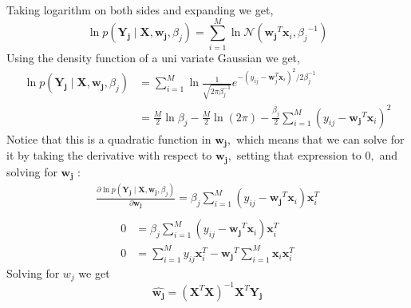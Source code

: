 \documentclass[english,a4paper,12pt]{article}
\begin{document}
\begin{enumerate}
\begin{itemize}
$$$$
Taking logarithm on both sides and expanding we get,
$$
\ln p(\mathbf{Y_j} \mid \mathbf{X}, \mathbf{w_j}, \beta_{j})=\sum_{i=1}^{M} \ln \mathcal{N}\left(\mathbf{w_j}^{T} \mathbf{x}_{i}, {\beta_j}^{-1}\right)
$$
Using the density function of a uni variate Gaussian we get,
$$
\begin{aligned}
\ln p(\mathbf{{Y}_{j}} \mid \mathbf{X}, \mathbf{{w}_{j}}, \beta_{j}) &=\sum_{i=1}^{M} \ln \frac{1}{\sqrt{2 \pi \beta_{j}^{-1}}} e^{-\left(y_{ij}-\mathbf{w}_{j}^{T} \mathbf{x}_{i}\right)^{2} / 2 \beta_{j}^{-1}} \\
&=\frac{M}{2} \ln \beta_{j}-\frac{M}{2} \ln(2 \pi)-\frac{\beta_{j}}{2} \sum_{i=1}^{M}\left(y_{ij}-\mathbf{w_j}^{T} \mathbf{x}_{i}\right)^{2}
\end{aligned}
$$
Notice that this is a quadratic function in $\mathbf{w_j},$ which means that we can solve for it by taking the derivative with respect to $\mathbf{w_j},$ setting that expression to $0,$ and solving for $\mathbf{w_j}$ :
\newpage
$$
\begin{aligned}
\frac{\partial \ln p(\mathbf{Y_{j}} \mid \mathbf{X}, \mathbf{w_{j}}, \beta_{j})}{\partial \mathbf{w_{j}}}=\beta_{j} \sum_{i=1}^{M}\left(y_{ij}-\mathbf{w_{j}}^{T} \mathbf{x}_{i}\right) \mathbf{x}_{i}^{T}\\
\end{aligned}
$$
$$
\begin{aligned}
0&=\beta_{j} \sum_{i=1}^{M}\left(y_{ij}-\mathbf{w_{j}}^{T} \mathbf{x}_{i}\right) \mathbf{x}_{i}^{T}\\
0&=\sum_{i=1}^{M} {y_{ij}} \mathbf{x}_{i}^{T}-\mathbf{w_j}^{T} \sum_{i=1}^{M} \mathbf{x}_{i} \mathbf{x}_{i}^{T}
\end{aligned}
$$
Solving for $w_j$ we get
$$
{\hat{\mathbf{w_{j}}}}=\left(\mathbf{X}^{T} \mathbf{X}\right)^{-1} \mathbf{X}^{T} \mathbf{Y_j}
$$


\end{itemize}
\end{enumerate}
\end{document}
